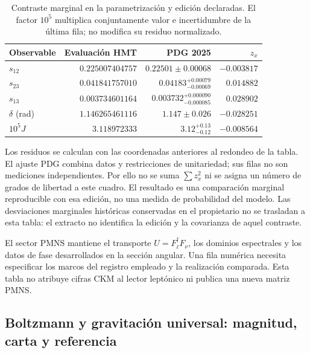 \begin{table}[htbp]
\centering\small
\setlength{\tabcolsep}{4pt}
\begin{tabular}{@{}lrrr@{}}
\toprule
Observable & Evaluación HMT & PDG 2025 & \(z_x\)\\
\midrule
\(s_{12}\) & \(0.225007404757\) & \(0.22501\pm0.00068\) & \(-0.003817\)\\
\(s_{23}\) & \(0.041841757010\) & \(0.04183^{+0.00079}_{-0.00069}\) & \(0.014882\)\\
\(s_{13}\) & \(0.003734601164\) & \(0.003732^{+0.000090}_{-0.000085}\) & \(0.028902\)\\
\(\delta\) (rad) & \(1.146265461116\) & \(1.147\pm0.026\) & \(-0.028251\)\\
\(10^5J\) & \(3.118972333\) & \(3.12^{+0.13}_{-0.12}\) & \(-0.008564\)\\
\bottomrule
\end{tabular}
\caption{Contraste marginal en la parametrización y edición declaradas.
El factor \(10^5\) multiplica conjuntamente valor e incertidumbre de la
última fila; no modifica su residuo normalizado.}
\label{ii:tab:ii-ckm-comparacion}
\end{table}

Los residuos se calculan con las coordenadas anteriores al redondeo
de la tabla. El ajuste PDG combina datos y restricciones de unitariedad;
sus filas no son mediciones independientes. Por ello no se suma
\(\sum z_x^2\) ni se asigna un número de grados de libertad a este cuadro.
El resultado es una comparación marginal reproducible con esa edición,
no una medida de probabilidad del modelo. Las desviaciones marginales
históricas conservadas en el propietario no se trasladan a esta tabla:
el extracto no identifica la edición y la covarianza de aquel contraste.

El sector PMNS mantiene el transporte \(U=F_\ell^\dagger F_\nu\), los
dominios espectrales y los datos de fase desarrollados en la sección
angular. Una fila numérica necesita especificar los marcos del registro
empleado y la realización comparada. Esta tabla no atribuye cifras CKM
al lector leptónico ni publica una nueva matriz PMNS.

\subsection{Boltzmann y gravitación universal: magnitud, carta y referencia}

